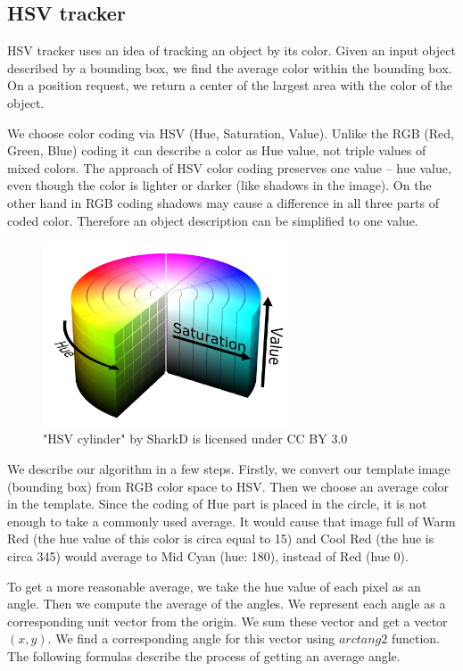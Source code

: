 \subsection{HSV tracker}

HSV tracker uses an idea of tracking an object by its color. Given an input
object described by a bounding box, we find the average color within the
bounding box. On a position request, we return a center of the largest area
with the color of the object.

We choose color coding via HSV (Hue, Saturation, Value). Unlike the RGB (Red,
Green, Blue) coding it can describe a color as Hue value, not triple values of
mixed colors. The approach of HSV color coding preserves one value -- hue
value,  even though the color is lighter or darker (like shadows in the image).
On the other hand in RGB coding shadows may cause a difference in all three
parts of coded color. Therefore an object description can be simplified
to one value.

\begin{figure}[h!]\centering
\includegraphics[width=0.65\textwidth]{img/hsv-cylinder.png}
\caption{"HSV cylinder" by SharkD is licensed under CC BY 3.0}
\end{figure}

We describe our algorithm in a few steps. Firstly, we convert our template
image (bounding box) from RGB color space to HSV. Then we choose an average
color in the template. Since the coding of Hue part is placed in the circle, it
is not enough to take a commonly used average. It would cause that image full
of Warm Red (the hue value of this color is circa equal to 15) and Cool Red
(the hue is circa 345) would average to Mid Cyan (hue: 180), instead of Red
(hue 0).

To get a more reasonable average, we take the hue value of each pixel as an
angle. Then we compute the average of the angles. We represent each angle as a
corresponding unit vector from the origin. We sum these vector and get a vector
$(x, y)$. We find a corresponding angle for this vector using $arctang2$
function.  The following formulas describe the process of getting an average
angle.

